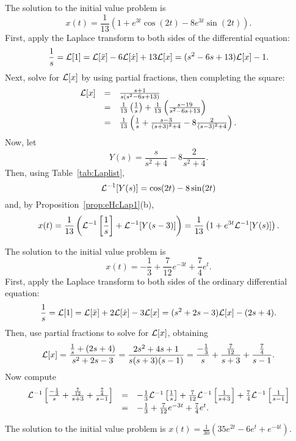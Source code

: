  \ans The solution to the initial value problem is
\[
x(t) = \frac{1}{13}\left(1 + e^{3t}\cos(2t) - 8e^{3t}\sin(2t)\right).
\]
\soln First, apply the Laplace transform to both sides of the differential
equation:
\[
\frac{1}{s} = {\cal L}[1]
= {\cal L}[\ddot{x}] - 6{\cal L}[\dot{x}] + 13{\cal L}[x]
= (s^2 - 6s + 13){\cal L}[x] - 1.
\]
Next, solve for ${\cal L}[x]$ by using partial fractions, then completing
the square:
\[
\begin{array}{rcl}
{\cal L}[x] & = & \frac{s + 1}{s(s^2 - 6s + 13)} \\
& = & \frac{1}{13}\left(\frac{1}{s}\right) +
\frac{1}{13}\left(\frac{s - 19}{s^2 - 6s + 13}\right) \\
& = & \frac{1}{13}\left(\frac{1}{s} +
\frac{s - 3}{(s + 3)^2 + 4} - 8\frac{2}{(s - 3)^2 + 4}\right).
\end{array}
\]
Now, let
\[
Y(s) = \frac{s}{s^2 + 4} - 8\frac{2}{s^2 + 4}.
\]
Then, using Table~\ref{tab:Laplist},
\[
{\cal L}^{-1}[Y(s)] = \cos(2t) - 8\sin(2t)
\]
and, by Proposition~\ref{prop:eHcLap1}(b),
\[
x(t) = \frac{1}{13}\left({\cal L}^{-1}\left[\frac{1}{s}\right] +
{\cal L}^{-1}[Y(s - 3)]\right) =
\frac{1}{13}\left(1 + e^{3t}{\cal L}^{-1}[Y(s)]\right).
\]



 \ans The solution to the initial value problem is
\[
x(t) = -\frac{1}{3} + \frac{7}{12}e^{-3t} + \frac{7}{4}e^t.
\]
\soln First, apply the Laplace transform to both sides of the ordinary
differential equation:
\[
\frac{1}{s} = {\cal L}[1]
= {\cal L}[\ddot{x}] + 2{\cal L}[\dot{x}] - 3{\cal L}[x]
= (s^2 + 2s - 3){\cal L}[x] - (2s + 4).
\]
Then, use partial fractions to solve for ${\cal L}[x]$, obtaining
\[
{\cal L}[x] = \frac{\frac{1}{s} + (2s + 4)}{s^2 + 2s - 3}
= \frac{2s^2 + 4s + 1}{s(s + 3)(s - 1)}
= \frac{-\frac{1}{3}}{s} + \frac{\frac{7}{12}}{s + 3}
+ \frac{\frac{7}{4}}{s - 1}.
\]
Now compute
\[
\begin{array}{rcl}
{\cal L}^{-1}\left[\frac{-\frac{1}{3}}{s} + \frac{\frac{7}{12}}{s + 3}
+ \frac{\frac{7}{4}}{s - 1}\right]
& = & -\frac{1}{3}{\cal L}^{-1}\left[\frac{1}{s}\right]
+ \frac{7}{12}{\cal L}^{-1}\left[\frac{1}{s + 3}\right]
+ \frac{7}{4}{\cal L}^{-1}\left[\frac{1}{s - 1}\right] \\
& = & -\frac{1}{3} + \frac{7}{12}e^{-3t} + \frac{7}{4}e^t.
\end{array}
\]

 \ans The solution to the initial value problem is
$x(t) = \frac{1}{30}(35e^{2t}-6e^t+e^{-4t})$.

